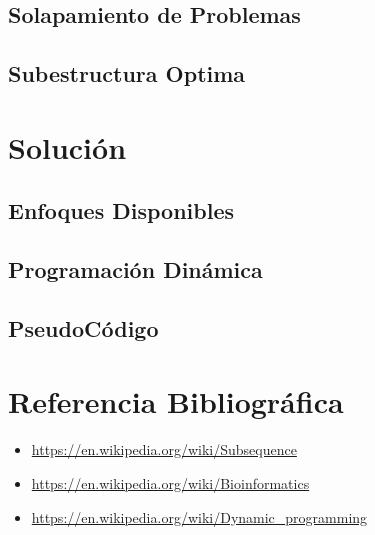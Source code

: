 \documentclass{article}
\begin{document}
	\subsection{Solapamiento de Problemas}
	
	\subsection{Subestructura Optima}

\section{Solución}
	\subsection{Enfoques Disponibles}

	\subsection{Programación Dinámica}

	\subsection{PseudoCódigo}

\section{Referencia Bibliográfica}

	\begin{itemize}
		\item \url{https://en.wikipedia.org/wiki/Subsequence}	
		\item \url{https://en.wikipedia.org/wiki/Bioinformatics}	
		\item \url{https://en.wikipedia.org/wiki/Dynamic_programming}	
		
		
		
	\end{itemize}
\end{document}

